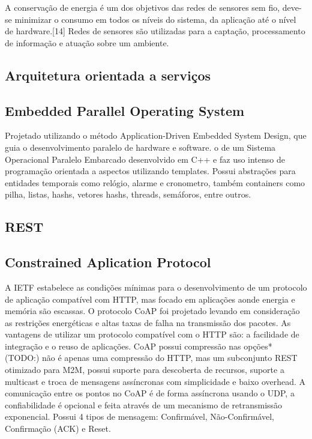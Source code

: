 A conservação de energia é um dos objetivos das redes de sensores sem fio, deve-se minimizar o consumo em todos os níveis do sistema, da aplicação até o nível de hardware.[14] Redes de sensores são utilizadas para a captação, processamento de informação e atuação sobre um ambiente.

\subsection{Arquitetura orientada a serviços}

\subsection{Embedded Parallel Operating System}
Projetado utilizando o método Application-Driven Embedded System Design, que guia o desenvolvimento paralelo de hardware e software.
o de um Sistema Operacional Paralelo Embarcado desenvolvido em C++ e faz uso intenso de programação orientada a aspectos utilizando templates. Possui abstrações para entidades temporais como relógio, alarme e cronometro, também containers como pilha, listas, hashs, vetores
hashs, threads, semáforos, entre outros.

\subsection{REST}

\subsection{Constrained Aplication Protocol}

A IETF estabelece as condições mínimas para o desenvolvimento de um protocolo de aplicação compatível com HTTP, mas focado em aplicações aonde energia e memória são escassas. O protocolo CoAP foi projetado levando em consideração as restrições energéticas e altas taxas de falha na transmissão dos pacotes. As vantagens de utilizar um protocolo compatível com o HTTP são: a facilidade de integração e o reuso de aplicações. CoAP possui compressão nas opções* (TODO:) não é apenas uma compressão do HTTP, mas um subconjunto REST otimizado para M2M, possui suporte para descoberta de recursos, suporte a multicast e troca de mensagens assíncronas com simplicidade e baixo overhead. A comunicação entre os pontos no CoAP é de forma assíncrona usando o UDP, a confiabilidade é opcional e feita através de um mecanismo de retransmissão exponencial. Possui 4 tipos de mensagem: Confirmável, Não-Confirmável, Confirmação (ACK) e Reset.


